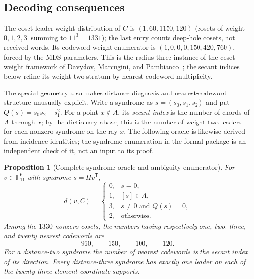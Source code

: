 \documentclass[11pt]{article}
\newtheorem{proposition}[theorem]{Proposition}
\theoremstyle{definition}
\theoremstyle{remark}
\newcommand{\F}{\mathbb{F}}
\begin{document}
\subsection{Decoding consequences}

The coset-leader-weight distribution of $C$ is $(1,60,1150,120)$
(cosets of weight $0,1,2,3$, summing to $11^3=1331$); the last entry counts
deep-hole cosets, not received words. Its codeword weight enumerator is
$(1,0,0,0,150,420,760)$, forced by the MDS parameters.
This is the radius-three instance of the coset-weight framework of Davydov,
Marcugini, and Pambianco~\cite[\S6]{DMP2021}; the secant indices below
refine its weight-two stratum by nearest-codeword multiplicity.

The special geometry also makes distance diagnosis and nearest-codeword
structure unusually explicit.  Write a syndrome as $s=(s_0,s_1,s_2)$ and put
$Q(s)=s_0s_2-s_1^2$.
For a point $x\notin A$, its \emph{secant index} is the number of chords of
$A$ through $x$; by the dictionary above, this is the number of
weight-two leaders for each nonzero syndrome on the ray $x$.
The following oracle is likewise derived from incidence identities; the
syndrome enumeration in the formal package is an independent check of it,
not an input to its proof.

\begin{proposition}[Complete syndrome oracle and ambiguity enumerator]
\label{prop:decoding-oracle}
For $v\in\F_{11}^6$ with syndrome $s=Hv^{\mathsf T}$,
\[
 d(v,C)=
 \begin{cases}
 0,&s=0,\\
 1,&[s]\in A,\\
 3,&s\ne0\text{ and }Q(s)=0,\\
 2,&\text{otherwise}.
 \end{cases}
\]
Among the $1330$ nonzero cosets, the numbers having respectively one, two,
three, and twenty nearest codewords are
\[
 960,\qquad150,\qquad100,\qquad120.
\]
For a distance-two syndrome the number of nearest codewords is the secant
index of its direction. Every distance-three syndrome has exactly one
leader on each of the
twenty three-element coordinate supports.
\end{proposition}
\end{document}
